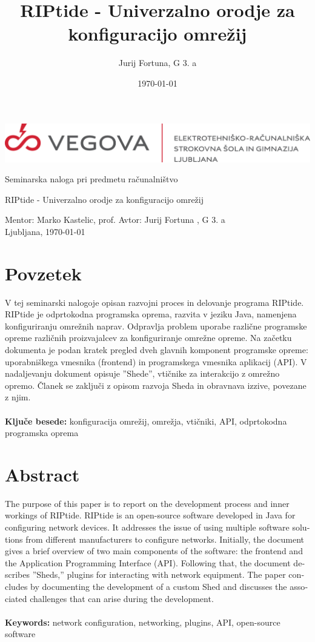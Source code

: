 \documentclass[12pt]{article}
\title{RIPtide - Univerzalno orodje za konfiguracijo omrežij}
\author{Jurij Fortuna, G 3. a}
\date{\MMYYYYdate\today}
\begin{document}
\begin{center}
	\thispagestyle{empty}
	\includegraphics[scale=1]{slike/vegova.png}

	\vspace{\fill}
	Seminarska naloga pri predmetu računalništvo

	\Huge{RIPtide - Univerzalno orodje za konfiguracijo omrežij}

	\normalsize
	\vspace{\fill}

	Mentor: Marko Kastelic, prof. \hfill Avtor: Jurij Fortuna , G 3. a\\
	\null
	Ljubljana, \MMYYYYdate\today
\end{center}
\newpage

\section*{Povzetek}
V tej seminarski nalogoje opisan razvojni proces in delovanje programa
RIPtide. RIPtide je odprtokodna programska oprema, razvita v jeziku Java,
namenjena konfiguriranju omrežnih naprav. Odpravlja problem uporabe
različne programske opreme različnih proizvajalcev za konfiguriranje
omrežne opreme. Na začetku dokumenta je podan kratek pregled dveh glavnih
komponent programske opreme: uporabniškega vmesnika (frontend) in
programskega vmesnika aplikacij (API). V nadaljevanju dokument opisuje
''Shede'', vtičnike za interakcijo z omrežno opremo. Članek se zaključi z
opisom razvoja Sheda in obravnava izzive, povezane z njim.
\\\\
\textbf{Ključe besede:} konfiguracija omrežij, omrežja, vtičniki, API,
odprtokodna programska oprema
\\
\section*{Abstract}
\foreignlanguage{english}{
	The purpose of this paper is to report on the development process and
	inner workings of RIPtide. RIPtide is an open-source software developed
	in Java for configuring network devices. It addresses the issue of
	using multiple software solutions from different manufacturers to
	configure networks. Initially, the document gives a brief overview of
	two main components of the software: the frontend and the Application
	Programming Interface (API). Following that, the document describes
	''Sheds,'' plugins for interacting with network equipment. The paper
	concludes by documenting the development of a custom Shed and discusses
	the associated challenges that can arise during the development.
	\\\\
	\textbf{Keywords:} network configuration, networking, plugins, API,
	open-source software
}
\newpage
\end{document}
